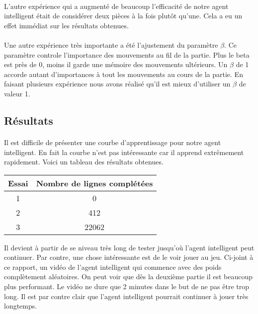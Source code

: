 \documentclass[a4paper, 12pt]{article} %
\begin{document}
    \paragraph{}
    L'autre expérience qui a augmenté de beaucoup l'efficacité de notre agent intelligent était de considérer deux pièces
    à la fois plutôt qu'une. Cela a eu un effet immédiat sur les résultats obtenues. 

    \paragraph{}
    Une autre expérience très importante a été l'ajustement du paramètre $\beta$. Ce paramètre controle l'importance
    des mouvements au fil de la partie. Plus le beta est près de 0, moins il garde une mémoire des mouvements ultérieurs.
    Un $\beta$ de 1 accorde autant d'importances à tout les mouvements au cours de la partie. En faisant plusieurs
    expérience nous avons réalisé qu'il est mieux d'utiliser un $\beta$ de valeur 1.

    \subsection{Résultats}
        \paragraph{}
	Il est difficile de présenter une courbe d'apprentissage pour notre agent intelligent. En fait la courbe
	n'est pas intéressante car il apprend extrêmement rapidement. Voici un tableau des résultats obtenues.

	\begin{center}
	\begin{tabular}[H]{|c|c|}
	    \hline
	    Essai & Nombre de lignes complétées \\
	    \hline
	    1     & 0 \\
	    \hline
	    2     & 412 \\
	    \hline
	    3     & 22062 \\
	    \hline
	\end{tabular}
	\end{center}

	Il devient à partir de se niveau très long de tester jusqu'où l'agent intelligent peut continuer. Par contre,
	une chose intéressante est de le voir jouer au jeu. Ci-joint à ce rapport, un vidéo de l'agent intelligent qui
	commence avec des poids complètement aléatoires. On peut voir que dès la deuxième partie il est beaucoup plus performant.
	Le vidéo ne dure que 2 minutes dans le but de ne pas être trop long. Il est par contre clair que l'agent intelligent
	pourrait continuer à jouer très longtemps.
\end{document}
